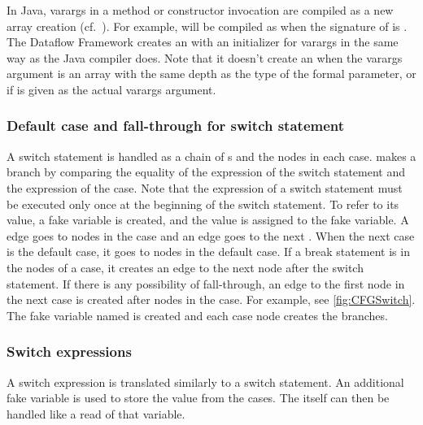 In Java, varargs in a method or constructor invocation are compiled
as a new array creation (cf.\ ). For example,
 will be compiled as 
when the signature of  is . The Dataflow
Framework creates an  with an initializer for varargs
in the same way as the Java compiler does.
Note that it doesn't create an 
when the varargs argument is an array with the same depth as the type of
the formal parameter, or if  is given as the actual varargs argument.

\subsubsection{Default case and fall-through for switch statement}
\label{sec:default-switch}

A switch statement is handled as a chain of s and the nodes in
each case.  makes a branch by comparing the equality of
the expression of the switch statement and the expression of the case.
Note that the expression of a switch statement must be executed only
once at the beginning of the switch statement. To refer to its value, a fake variable
is created, and the value is assigned to the fake variable. A 
edge goes to nodes in the case and an  edge goes to the next
. When the next case is the default case, it goes to nodes in the default
case. If a break statement is in the nodes of a case, it creates an edge
to the next node after the switch statement. If there is any possibility of fall-through, an edge
to the first node in the next case is created after nodes in the case.
For example, see \autoref{fig:CFGSwitch}. The fake variable named 
is created and each case node creates the branches.


\subsubsection{Switch expressions}
\label{sec:switch-expr}

A switch expression is translated similarly to a switch statement.
An additional fake variable  is used to store the value
from the cases. The  itself can then be
handled like a read of that variable.

